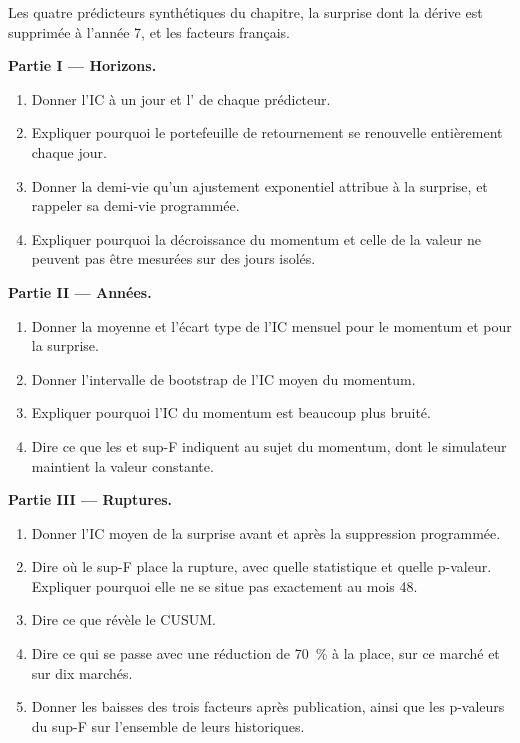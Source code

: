 \begin{problem}\label{pb:rs:half-life-decay-and-stability:1}
Les quatre prédicteurs synthétiques du chapitre, la surprise dont la dérive est supprimée à l'année 7, et les facteurs français.

\medskip\noindent\textbf{Partie I --- Horizons.}
\begin{enumerate}
\item Donner l'IC à un jour et l' de chaque prédicteur.
\item Expliquer pourquoi le portefeuille de retournement se renouvelle entièrement chaque jour.
\item Donner la demi-vie qu'un ajustement exponentiel attribue à la surprise, et rappeler sa demi-vie programmée.
\item Expliquer pourquoi la décroissance du momentum et celle de la valeur ne peuvent pas être mesurées sur des jours isolés.
\end{enumerate}

\medskip\noindent\textbf{Partie II --- Années.}
\begin{enumerate}[resume]
\item Donner la moyenne et l'écart type de l'IC mensuel pour le momentum et pour la surprise.
\item Donner l'intervalle de bootstrap de l'IC moyen du momentum.
\item Expliquer pourquoi l'IC du momentum est beaucoup plus bruité.
\item Dire ce que les  et sup-F indiquent au sujet du momentum, dont le simulateur maintient la valeur constante.
\end{enumerate}

\medskip\noindent\textbf{Partie III --- Ruptures.}
\begin{enumerate}[resume]
\item Donner l'IC moyen de la surprise avant et après la suppression programmée.
\item Dire où le sup-F place la rupture, avec quelle statistique et quelle p-valeur. Expliquer pourquoi elle ne se situe pas exactement au mois 48.
\item Dire ce que révèle le CUSUM.
\item Dire ce qui se passe avec une réduction de 70~\% à la place, sur ce marché et sur dix marchés.
\item Donner les baisses des trois facteurs après publication, ainsi que les p-valeurs du sup-F sur l'ensemble de leurs historiques.
\end{enumerate}


\end{problem}

